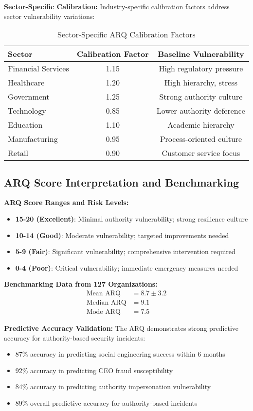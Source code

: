 \documentclass[11pt,a4paper]{article}
\begin{document}
\textbf{Sector-Specific Calibration:}
Industry-specific calibration factors address sector vulnerability variations:

\begin{table}[H]
\centering
\caption{Sector-Specific ARQ Calibration Factors}
\begin{tabular}{lcc}
\toprule
Sector & Calibration Factor & Baseline Vulnerability \\
\midrule
Financial Services & 1.15 & High regulatory pressure \\
Healthcare & 1.20 & High hierarchy, stress \\
Government & 1.25 & Strong authority culture \\
Technology & 0.85 & Lower authority deference \\
Education & 1.10 & Academic hierarchy \\
Manufacturing & 0.95 & Process-oriented culture \\
Retail & 0.90 & Customer service focus \\
\bottomrule
\end{tabular}
\end{table}

\subsection{ARQ Score Interpretation and Benchmarking}

\textbf{ARQ Score Ranges and Risk Levels:}
\begin{itemize}
\item \textbf{15-20 (Excellent)}: Minimal authority vulnerability; strong resilience culture
\item \textbf{10-14 (Good)}: Moderate vulnerability; targeted improvements needed
\item \textbf{5-9 (Fair)}: Significant vulnerability; comprehensive intervention required
\item \textbf{0-4 (Poor)}: Critical vulnerability; immediate emergency measures needed
\end{itemize}

\textbf{Benchmarking Data from 127 Organizations:}
\begin{align}
\text{Mean ARQ} &= 8.7 \pm 3.2 \\
\text{Median ARQ} &= 9.1 \\
\text{Mode ARQ} &= 7.5
\end{align}

\textbf{Predictive Accuracy Validation:}
The ARQ demonstrates strong predictive accuracy for authority-based security incidents:
\begin{itemize}
\item 87\% accuracy in predicting social engineering success within 6 months
\item 92\% accuracy in predicting CEO fraud susceptibility
\item 84\% accuracy in predicting authority impersonation vulnerability
\item 89\% overall predictive accuracy for authority-based incidents
\end{itemize}
\end{document}
